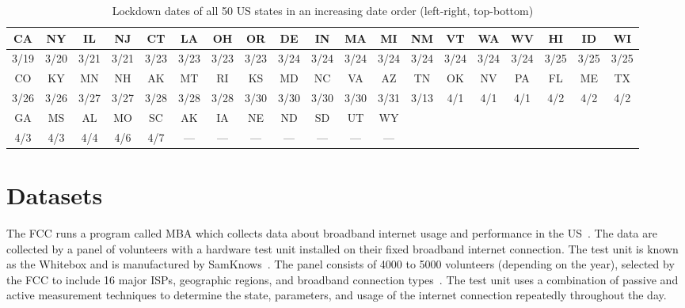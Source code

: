 \documentclass[conference,10pt]{IEEEtran}
\begin{document}
\begin{table}
  \centering
  \caption{Lockdown dates of all 50 \gls{US} states in an increasing date order (left-right, top-bottom)}
  \label{tab:state-lockdown}
  \begin{tabular}{ |c|c|c|c|c|c|c|c|c|c|c|c|c|c|c|c|c|c|c| }
    \hline
    CA   & NY   & IL   & NJ   & CT   & LA   & OH   & OR   & DE   & IN   & MA   & MI   & NM   & VT   & WA   & WV   & HI   & ID   & WI   \\
    \hline
    3/19 & 3/20 & 3/21 & 3/21 & 3/23 & 3/23 & 3/23 & 3/23 & 3/24 & 3/24 & 3/24 & 3/24 & 3/24 & 3/24 & 3/24 & 3/24 & 3/25 & 3/25 & 3/25 \\
    \hline\hline
    CO   & KY   & MN   & NH   & AK   & MT   & RI   & KS   & MD   & NC   & VA   & AZ   & TN   & OK   & NV   & PA   & FL   & ME   & TX   \\
    \hline
    3/26 & 3/26 & 3/27 & 3/27 & 3/28 & 3/28 & 3/28 & 3/30 & 3/30 & 3/30 & 3/30 & 3/31 & 3/13 & 4/1  & 4/1  & 4/1  & 4/2  & 4/2  & 4/2  \\
    \hline\hline
    GA   & MS   & AL   & MO   & SC   & AK   & IA   & NE   & ND   & SD   & UT   & WY   & \multicolumn{7}{|c|}{}                         \\
    \hline
    4/3  & 4/3  & 4/4  & 4/6  & 4/7  & ---  & ---  & ---  & ---  & ---  & ---  & ---  & \multicolumn{7}{|c|}{}                         \\
    \hline
  \end{tabular}
\end{table}


\section{Datasets}\label{sec:datasets}

The \gls{FCC} runs a program called \gls{MBA} which collects data about broadband internet usage and performance in the \gls{US}~\cite{mba}. The data are collected by a panel of volunteers with a hardware test unit installed on their fixed broadband internet connection. The test unit is known as the Whitebox and is manufactured by SamKnows~\cite{sam}. The panel consists of 4000 to 5000 volunteers (depending on the year), selected by the \gls{FCC} to include 16 major \glspl{ISP}, geographic regions, and broadband connection types~\cite{fcc-report-appendix}. The test unit uses a combination of passive and active measurement techniques to determine the state, parameters, and usage of the internet connection repeatedly throughout the day.
\end{document}

